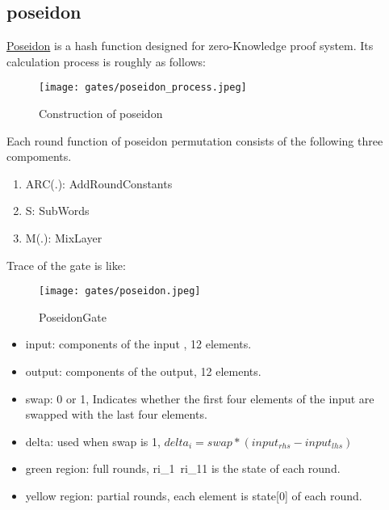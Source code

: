 \subsection{poseidon}

\href{https://www.poseidon-hash.info/}{Poseidon} is a hash function designed for zero-Knowledge proof system.
Its calculation process is roughly as follows:

\begin{figure}[!h]
    \centering
    \texttt{[image: gates/poseidon\_process.jpeg]}
    \caption{Construction of poseidon}
    \label{fig:poseidon-process}
\end{figure}

Each round function of poseidon permutation consists of the following three compoments.
\begin{enumerate}
    \item ARC(.): AddRoundConstants
    \item S: SubWords
    \item M(.): MixLayer
\end{enumerate}

Trace of the gate is like:
\begin{figure}[!h]
    \centering
    \texttt{[image: gates/poseidon.jpeg]}
    \caption{PoseidonGate}
    \label{fig:poseidon-gate}
\end{figure}

\begin{itemize}
    \item input: components of the input , 12 elements.
    \item output: components of the output, 12 elements.
    \item swap: 0 or 1, Indicates whether the first four elements of the input are swapped with the last four elements.
    \item delta: used when swap is 1, $delta_i = swap * (input_{rhs} - input_{lhs})$
    \item green region: full rounds, ri\_1~ri\_11 is the state of each round.
    \item yellow region: partial rounds, each element is state[0] of each round.
\end{itemize}

